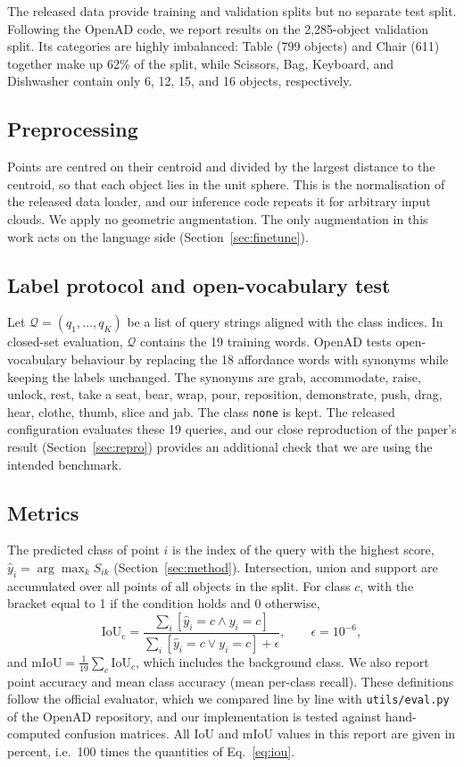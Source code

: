 \documentclass[conference]{IEEEtran}
\begin{document}
The released data provide training and validation splits but no separate test split. Following the OpenAD code, we report results on the 2,285-object validation split. Its categories are highly imbalanced: Table (799 objects) and Chair (611) together make up 62\% of the split, while Scissors, Bag, Keyboard, and Dishwasher contain only 6, 12, 15, and 16 objects, respectively.

\subsection{Preprocessing}
Points are centred on their centroid and divided by the largest distance to the centroid, so that each object lies in the unit sphere. This is the normalisation of the released data loader, and our inference code repeats it for arbitrary input clouds. We apply no geometric augmentation. The only augmentation in this work acts on the language side (Section~\ref{sec:finetune}).

\subsection{Label protocol and open-vocabulary test}
Let $\mathcal{Q}=(q_1,\dots,q_K)$ be a list of query strings aligned with the class indices. In closed-set evaluation, $\mathcal{Q}$ contains the 19 training words. OpenAD tests open-vocabulary behaviour by replacing the 18 affordance words with synonyms while keeping the labels unchanged. The synonyms are grab, accommodate, raise, unlock, rest, take a seat, bear, wrap, pour, reposition, demonstrate, push, drag, hear, clothe, thumb, slice and jab. The class \texttt{none} is kept. The released configuration evaluates these 19 queries, and our close reproduction of the paper's result (Section~\ref{sec:repro}) provides an additional check that we are using the intended benchmark.

\subsection{Metrics}
The predicted class of point $i$ is the index of the query with the highest score, $\hat{y}_i=\arg\max_k S_{ik}$ (Section~\ref{sec:method}). Intersection, union and support are accumulated over all points of all objects in the split. For class $c$, with the bracket equal to 1 if the condition holds and 0 otherwise,
\begin{equation}
\mathrm{IoU}_c=\frac{\sum_i [\hat y_i=c\wedge y_i=c]}{\sum_i [\hat y_i=c\vee y_i=c]+\epsilon},\qquad \epsilon=10^{-6},
\label{eq:iou}
\end{equation}
and $\mathrm{mIoU}=\frac{1}{19}\sum_c \mathrm{IoU}_c$, which includes the background class. We also report point accuracy and mean class accuracy (mean per-class recall). These definitions follow the official evaluator, which we compared line by line with \texttt{utils/eval.py} of the OpenAD repository, and our implementation is tested against hand-computed confusion matrices. All IoU and mIoU values in this report are given in percent, i.e.\ 100 times the quantities of Eq.~\eqref{eq:iou}.
\end{document}

